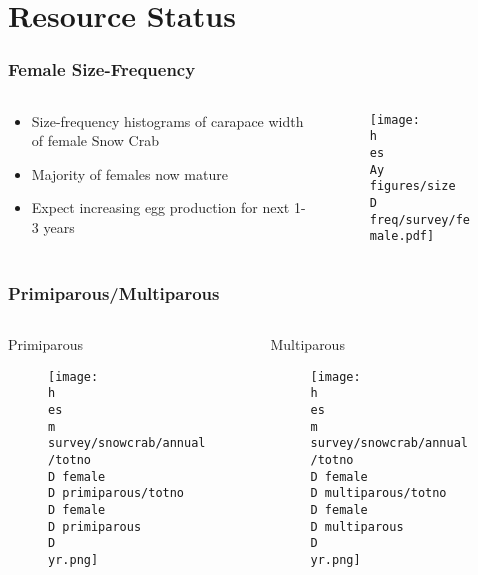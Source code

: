 \documentclass{beamer}
\numberwithin{equation}{section}		%
\numberwithin{figure}{section}	   	%
\numberwithin{table}{section}				%
\newcommand{\yr}{2017}
\newcommand{\D}{.}  %
\newcommand{\h}{C:/} %
\newcommand{\es}{bio.data/bio.snowcrab/} %
\newcommand{\Ay}{assessments/2017/}
\newcommand{\m}{output/maps/} %
\begin{document}
\section{Resource Status}


\begin{frame}
\frametitle{Female Size-Frequency}
\begin{columns}
	\begin{column}{0.5\textwidth}
		\begin{itemize}
		\item Size-frequency histograms of carapace width of female Snow Crab
		\item Majority of females now mature
		\item Expect increasing egg production for next 1-3 years
		\end{itemize}
	\end{column}

	\begin{column}{0.5\textwidth}
	\begin{figure}
		\texttt{[image: \\h \\es \\Ay figures/size\\D freq/survey/female.pdf]}
	\end{figure}
	\end{column}
	\end{columns}
\end{frame}



\begin{frame}
\frametitle{Primiparous/Multiparous}
\begin{columns}
	\begin{column}{0.5\textwidth}
	\begin{center}
	Primiparous 
	\vspace*{-0.65cm}
	\end{center}
		\begin{figure}
		\texttt{[image: \\h \\es \\m survey/snowcrab/annual/totno\\D female\\D primiparous/totno\\D female\\D primiparous\\D \\yr.png]}
	\end{figure}
	\end{column}

	\begin{column}{0.5\textwidth}
	\begin{center}
	Multiparous 
	\vspace*{-0.65cm}
	\end{center}
	\begin{figure}
		\texttt{[image: \\h \\es \\m survey/snowcrab/annual/totno\\D female\\D multiparous/totno\\D female\\D multiparous\\D \\yr.png]}	
	\end{figure}
	\end{column}
\end{columns}
\end{frame}
\end{document}

